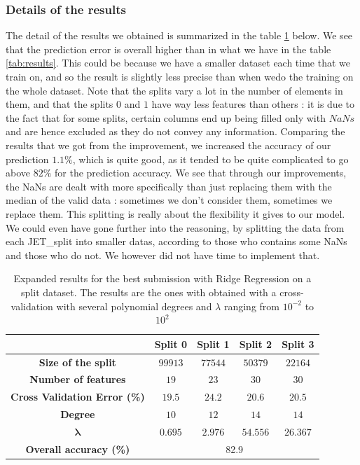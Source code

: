 \documentclass[10pt,conference,compsocconf]{IEEEtran}
\begin{document}
\subsubsection{Details of the results}
The detail of the results we obtained is summarized in the table \ref{tab:RR} below. We see that the prediction error is overall higher than in what we have in the table \ref{tab:results}. This could be because we have a smaller dataset each time that we train on, and so the result is slightly less precise than when wedo the training on the whole dataset. Note that the splits vary a lot in the number of elements in them, and that the splits $0$ and $1$ have way less features than others : it is due to the fact that for some splits, certain columns end up being filled only with $NaNs$ and are hence excluded as they do not convey any information. Comparing the results that we got from the improvement, we increased the accuracy of our prediction $1.1\%$, which is quite good, as it tended to be quite complicated to go above  $82\%$ for the prediction accuracy. We see that through our improvements, the NaNs are dealt with more specifically than just replacing them with the median of the valid data : sometimes we don't consider them, sometimes we replace them. This splitting is really about the flexibility it gives to our model. We could even have gone further into the reasoning, by splitting the data from each JET\_split into smaller datas, according to those who contains some NaNs and those who do not. We however did not have time to implement that.

\begin{table}[!ht]
	\centering
	\begin{tabular}{c||c|c|c|c}
		&\textbf{Split 0} & \textbf{Split 1} & \textbf{Split 2}& \textbf{Split 3}\\
		\hline
		\textbf{Size of the split} & $99913$ & $77544$& $50379$ & $22164$\\
		\hline
		\textbf{Number of features} & $19$ & $23$ & $30$ & $30$ \\
		\hline
		\textbf{Cross Validation Error (\%)} & $19.5$&$24.2$&$20.6$&$20.5$\\
		\hline
		\textbf{Degree} & $10$ & $12$ & $14$ & $14$ \\
		\hline
		{$\mathbf{\lambda}$} & $0.695$ & $2.976$ & $54.556$ & $26.367$\\
		\hline
		\hline
		\textbf{Overall accuracy (\%)} &  \multicolumn{4}{|c}{82.9}
	\end{tabular}
	\caption{Expanded results for the best submission with Ridge Regression on a split dataset. The results are the ones with obtained with a cross-validation with several polynomial degrees and $\lambda$ ranging from $10^{-2}$ to $10^{2}$}
	\label{tab:RR}
\end{table}
\end{document}
